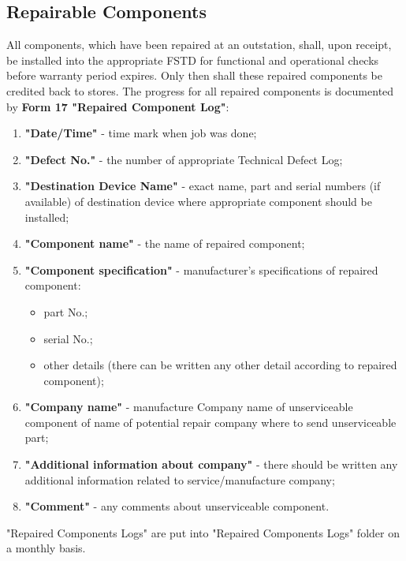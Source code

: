     \subsection{Repairable Components}
        All components, which have been repaired at an outstation, shall, upon receipt, be installed into the appropriate FSTD for functional and operational checks before 
        warranty period expires. Only then shall these repaired components be credited back to stores. The progress for all repaired components is documented by 
        \textbf{Form 17 "Repaired Component Log"}:
        \begin{enumerate}
            \item \textbf{"Date/Time"} - time mark when job was done;
            \item \textbf{"Defect No."} - the number of appropriate Technical Defect Log;
            \item \textbf{"Destination Device Name"} - exact name, part and serial numbers (if available) of destination device where appropriate component should be installed;
            \item \textbf{"Component name"} - the name of repaired component;
            \item \textbf{"Component specification"} - manufacturer's specifications of repaired component:
                \begin{itemize}
                    \item part No.;
                    \item serial No.;
                    \item other details (there can be written any other detail according to repaired component);
                \end{itemize}
            \item \textbf{"Company name"} - manufacture Company name of unserviceable component of name of potential repair company where to send unserviceable part;
            \item \textbf{"Additional information about company"} - there should be written any additional information related to service/manufacture company;
            \item \textbf{"Comment"} - any comments about unserviceable component.
        \end{enumerate}
        "Repaired Components Logs" are put into "Repaired Components Logs" folder on a monthly basis.


